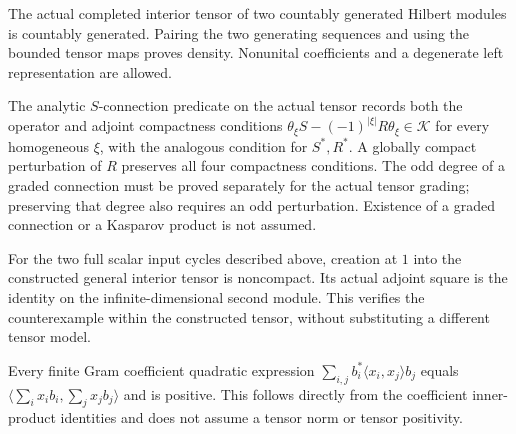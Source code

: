 \begin{proposition}\label{prop:interior-tensor-countable-generation}
\leanok
The actual completed interior tensor of two countably generated Hilbert
modules is countably generated. Pairing the two generating sequences and
using the bounded tensor maps proves density. Nonunital coefficients and
a degenerate left representation are allowed.
\end{proposition}

\begin{definition}\label{def:actual-kasparov-connection}
\leanok
The analytic $S$-connection predicate on the actual tensor records both the operator and
adjoint compactness conditions
$\theta_\xi S-(-1)^{|\xi|}R\theta_\xi\in\mathcal K$
for every homogeneous $\xi$, with the analogous condition for $S^*,R^*$.
A globally compact perturbation of $R$ preserves all four compactness conditions.
The odd degree of a graded connection must be proved separately for the actual
tensor grading; preserving that degree also requires an odd perturbation.
Existence of a graded connection or a Kasparov product is not assumed.
\end{definition}

\begin{proposition}\label{prop:actual-interior-creation-counterexample}
\leanok
For the two full scalar input cycles described above, creation at $1$
into the constructed general interior tensor is noncompact. Its actual
adjoint square is the identity on the infinite-dimensional second module.
This verifies the counterexample within the constructed tensor, without
substituting a different tensor model.
\end{proposition}

\begin{proposition}\label{prop:gram-coefficient-quadratic-positivity}
\leanok
Every finite Gram coefficient quadratic expression
$\sum_{i,j} b_i^*\langle x_i,x_j\rangle b_j$ equals
$\langle\sum_i x_i b_i,\sum_j x_j b_j\rangle$ and is positive.
This follows directly from the coefficient inner-product identities and
does not assume a tensor norm or tensor positivity.
\end{proposition}

